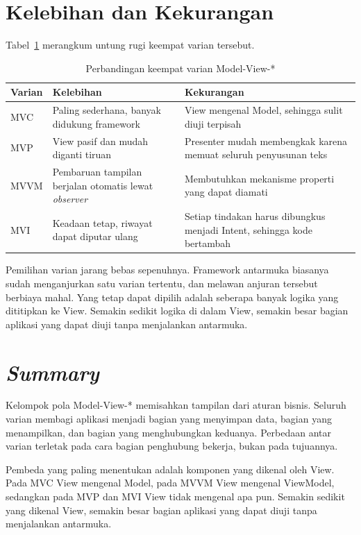 \section{Kelebihan dan Kekurangan}

Tabel~\ref{tab:untung-rugi-mv} merangkum untung rugi keempat varian tersebut.

\begin{table}[htbp]
  \centering
  \caption{Perbandingan keempat varian Model-View-*}
  \label{tab:untung-rugi-mv}
  \begin{tabularx}{\textwidth}{|l|X|X|}
    \hline
    \textbf{Varian} & \textbf{Kelebihan} & \textbf{Kekurangan} \\
    \hline
    MVC & Paling sederhana, banyak didukung framework & View mengenal Model, sehingga sulit diuji terpisah \\
    \hline
    MVP & View pasif dan mudah diganti tiruan & Presenter mudah membengkak karena memuat seluruh penyusunan teks \\
    \hline
    MVVM & Pembaruan tampilan berjalan otomatis lewat \textit{observer} & Membutuhkan mekanisme properti yang dapat diamati \\
    \hline
    MVI & Keadaan tetap, riwayat dapat diputar ulang & Setiap tindakan harus dibungkus menjadi Intent, sehingga kode bertambah \\
    \hline
  \end{tabularx}
\end{table}

Pemilihan varian jarang bebas sepenuhnya. Framework antarmuka biasanya sudah
menganjurkan satu varian tertentu, dan melawan anjuran tersebut berbiaya mahal.
Yang tetap dapat dipilih adalah seberapa banyak logika yang dititipkan ke View.
Semakin sedikit logika di dalam View, semakin besar bagian aplikasi yang dapat
diuji tanpa menjalankan antarmuka.

\section{\textit{Summary}}

Kelompok pola Model-View-* memisahkan tampilan dari aturan bisnis. Seluruh
varian membagi aplikasi menjadi bagian yang menyimpan data, bagian yang
menampilkan, dan bagian yang menghubungkan keduanya. Perbedaan antar varian
terletak pada cara bagian penghubung bekerja, bukan pada tujuannya.

Pembeda yang paling menentukan adalah komponen yang dikenal oleh View. Pada MVC
View mengenal Model, pada MVVM View mengenal ViewModel, sedangkan pada MVP dan
MVI View tidak mengenal apa pun. Semakin sedikit yang dikenal View, semakin
besar bagian aplikasi yang dapat diuji tanpa menjalankan antarmuka.

